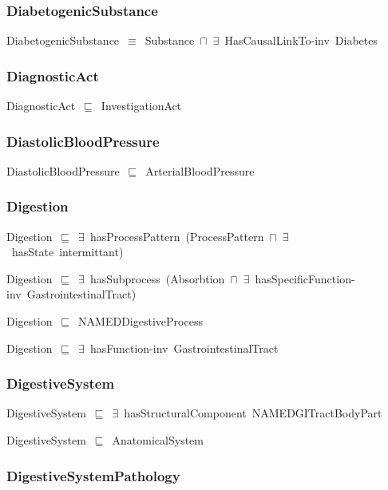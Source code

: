 \documentclass{article}
\begin{document}
\subsubsection*{DiabetogenicSubstance}

DiabetogenicSubstance~\ensuremath{\equiv}~Substance~\ensuremath{\sqcap}~\ensuremath{\exists}~HasCausalLinkTo-inv~Diabetes

\subsubsection*{DiagnosticAct}

DiagnosticAct~\ensuremath{\sqsubseteq}~InvestigationAct~

\subsubsection*{DiastolicBloodPressure}

DiastolicBloodPressure~\ensuremath{\sqsubseteq}~ArterialBloodPressure~

\subsubsection*{Digestion}

Digestion~\ensuremath{\sqsubseteq}~\ensuremath{\exists}~hasProcessPattern~(ProcessPattern~\ensuremath{\sqcap}~\ensuremath{\exists}~hasState~intermittant)~

Digestion~\ensuremath{\sqsubseteq}~\ensuremath{\exists}~hasSubprocess~(Absorbtion~\ensuremath{\sqcap}~\ensuremath{\exists}~hasSpecificFunction-inv~GastrointestinalTract)~

Digestion~\ensuremath{\sqsubseteq}~NAMEDDigestiveProcess~

Digestion~\ensuremath{\sqsubseteq}~\ensuremath{\exists}~hasFunction-inv~GastrointestinalTract~

\subsubsection*{DigestiveSystem}

DigestiveSystem~\ensuremath{\sqsubseteq}~\ensuremath{\exists}~hasStructuralComponent~NAMEDGITractBodyPart~

DigestiveSystem~\ensuremath{\sqsubseteq}~AnatomicalSystem~

\subsubsection*{DigestiveSystemPathology}
\end{document}
